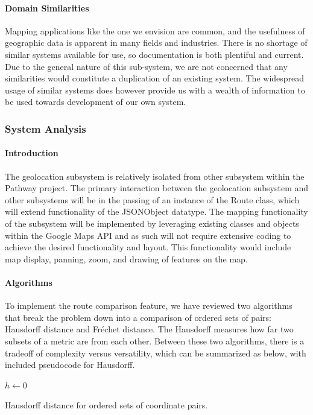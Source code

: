 ﻿\documentclass{article}
\begin{document}
\paragraph{Domain Similarities}
Mapping applications like the one we envision are common, and the usefulness of geographic data is apparent in many fields and industries. There is no shortage of similar systems available for use, so documentation is both plentiful and current. Due to the general nature of this sub-system, we are not concerned that any similarities would constitute a duplication of an existing system. The widespread usage of similar systems does however provide us with a wealth of information to be used towards development of our own system.

\subsubsection{System Analysis}
\paragraph{Introduction}
The geolocation subsystem is relatively isolated from other subsystem within the Pathway project. The primary interaction between the geolocation
subsystem and other subsystems will be in the passing of an instance of the Route class, which will extend functionality of the JSONObject datatype. The mapping functionality of the subsystem will be implemented by leveraging existing classes and objects within
the Google Maps API and as such will not require extensive coding to achieve the desired functionality and layout.
This functionality would include map display, panning, zoom, and drawing of features on the map.


\paragraph{Algorithms}
To implement the route comparison feature, we have reviewed two algorithms that break the problem down into a comparison of ordered sets of pairs:
Hausdorff distance and Fréchet distance. 
The Hausdorff measures how far two subsets of a metric are from each other. \cite{g_hausdorff}Between these two algorithms, there is a tradeoff of complexity versus versatility,
which can be summarized as below, with included pseudocode for Hausdorff.

\begin{algorithm}[h]
\SetAlgoLined
$h \gets 0$\\
\caption{Hausdorff distance for ordered sets of coordinate pairs.}
\end{algorithm}
\end{document}
